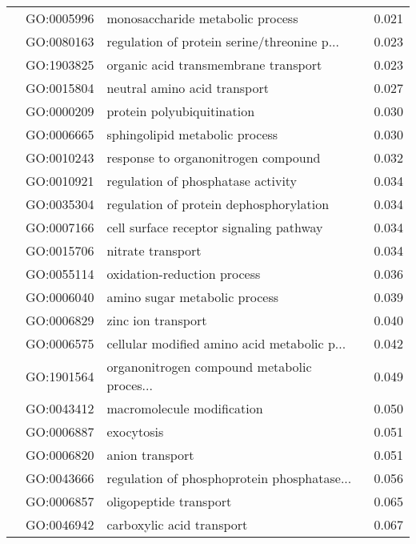 \begin{longtable}{lllr}
   & GO:0005996 &             monosaccharide metabolic process &         0.021 \\
   & GO:0080163 &  regulation of protein serine/threonine p... &         0.023 \\
   & GO:1903825 &         organic acid transmembrane transport &         0.023 \\
   & GO:0015804 &                 neutral amino acid transport &         0.027 \\
   & GO:0000209 &                   protein polyubiquitination &         0.030 \\
   & GO:0006665 &               sphingolipid metabolic process &         0.030 \\
   & GO:0010243 &          response to organonitrogen compound &         0.032 \\
   & GO:0010921 &           regulation of phosphatase activity &         0.034 \\
   & GO:0035304 &      regulation of protein dephosphorylation &         0.034 \\
   & GO:0007166 &      cell surface receptor signaling pathway &         0.034 \\
   & GO:0015706 &                            nitrate transport &         0.034 \\
   & GO:0055114 &                  oxidation-reduction process &         0.036 \\
   & GO:0006040 &                amino sugar metabolic process &         0.039 \\
   & GO:0006829 &                           zinc ion transport &         0.040 \\
   & GO:0006575 &  cellular modified amino acid metabolic p... &         0.042 \\
   & GO:1901564 &  organonitrogen compound metabolic proces... &         0.049 \\
   & GO:0043412 &                   macromolecule modification &         0.050 \\
   & GO:0006887 &                                   exocytosis &         0.051 \\
   & GO:0006820 &                              anion transport &         0.051 \\
   & GO:0043666 &  regulation of phosphoprotein phosphatase... &         0.056 \\
   & GO:0006857 &                       oligopeptide transport &         0.065 \\
   & GO:0046942 &                    carboxylic acid transport &         0.067 \\

\end{longtable}

